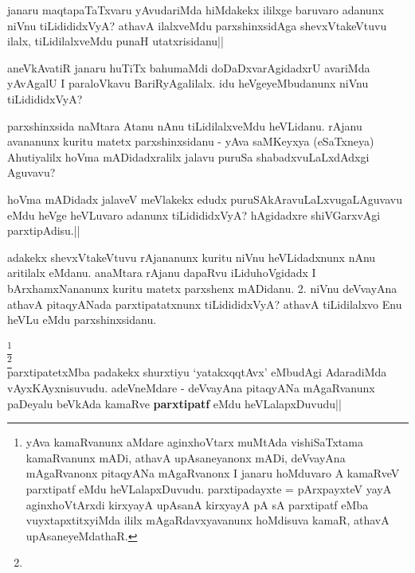 \begin{artha}
janaru maqtapaTaTxvaru yAvudariMda hiMdakekx ililxge baruvaro adanunx 
niVnu tiLidididxVyA? athavA ilalxveMdu parxshinxsidAga shevxVtakeVtuvu 
ilalx, tiLidilalxveMdu punaH utatxrisidanu||
\end{artha}


\begin{artha}
aneVkAvatiR janaru huTiTx bahumaMdi doDaDxvarAgidadxrU avariMda 
yAvAgalU I paraloVkavu BariRyAgalilalx. idu heVgeyeMbudanunx niVnu 
tiLidididxVyA?
\end{artha}


\begin{artha}
parxshinxsida naMtara Atanu nAnu tiLidilalxveMdu heVLidanu. rAjanu 
avananunx kuritu matetx parxshinxsidanu - yAva saMKeyxya (eSaTxneya) 
Ahutiyalilx hoVma mADidadxralilx jalavu puruSa shabadxvuLaLxdAdxgi 
Aguvavu?
\end{artha}


\begin{artha}
hoVma mADidadx jalaveV meVlakekx edudx puruSAkAravuLaLxvugaLAguvavu 
eMdu heVge heVLuvaro adanunx tiLidididxVyA? hAgidadxre shiVGarxvAgi 
parxtipAdisu.||
\end{artha}

\begin{artha}
adakekx shevxVtakeVtuvu rAjananunx kuritu niVnu heVLidadxnunx nAnu 
aritilalx eMdanu. anaMtara rAjanu dapaRvu iLiduhoVgidadx I 
bArxhamxNananunx kuritu matetx parxshenx mADidanu. 2. niVnu deVvayAna 
athavA pitaqyANada parxtipatatxnunx tiLidididxVyA? athavA tiLidilalxvo 
Enu heVLu eMdu parxshinxsidanu.
\end{artha}


\begin{artha}
\footnote[1]{yAva kamaRvanunx aMdare aginxhoVtarx muMtAda 
vishiSaTxtama kamaRvanunx mADi, athavA upAsaneyanonx mADi, deVvayAna 
mAgaRvanonx pitaqyANa mAgaRvanonx I janaru hoMduvaro A kamaRveV 
parxtipatf eMdu heVLalapxDuvudu. parxtipadayxte = pArxpayxteV yayA 
aginxhoVtArxdi kirxyayA upAsanA kirxyayA pA sA parxtipatf eMba 
vuyxtapxtitxyiMda ililx mAgaRdavxyavanunx hoMdisuva kamaR, athavA 
upAsaneyeMdathaR.}\\
\footnote[2]{}\\
parxtipatetxMba padakekx shurxtiyu `yatakxqqtAvx' eMbudAgi AdaradiMda 
vAyxKAyxnisuvudu. adeVneMdare - deVvayAna pitaqyANa mAgaRvanunx 
paDeyalu beVkAda kamaRve \textbf{parxtipatf} eMdu heVLalapxDuvudu||
\end{artha}

